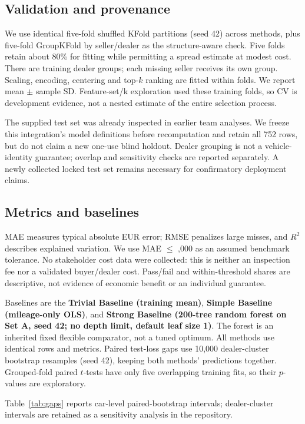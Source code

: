 \subsection{Validation and provenance}
We use identical five-fold shuffled KFold partitions (seed 42) across methods, plus five-fold GroupKFold by seller/dealer as the structure-aware check. Five folds retain about 80\% for fitting while permitting a spread estimate at modest cost. There are \TrainGroups{} training dealer groups; each missing seller receives its own group. Scaling, encoding, centering and top-$k$ ranking are fitted within folds. We report mean $\pm$ sample SD. Feature-set/k exploration used these training folds, so CV is development evidence, not a nested estimate of the entire selection process.

The supplied test set was already inspected in earlier team analyses. We freeze this integration's model definitions before recomputation and retain all 752 rows, but do not claim a new one-use blind holdout. Dealer grouping is not a vehicle-identity guarantee; overlap and sensitivity checks are reported separately. A newly collected locked test set remains necessary for confirmatory deployment claims.

\subsection{Metrics and baselines}
MAE measures typical absolute EUR error; RMSE penalizes large misses, and $R^2$ describes explained variation. We use MAE $\leq$ ,000 as an assumed benchmark tolerance. No stakeholder cost data were collected: this is neither an inspection fee nor a validated buyer/dealer cost. Pass/fail and within-threshold shares are descriptive, not evidence of economic benefit or an individual guarantee.

Baselines are the \textbf{Trivial Baseline (training mean)}, \textbf{Simple Baseline (mileage-only OLS)}, and \textbf{Strong Baseline (200-tree random forest on Set A, seed 42; no depth limit, default leaf size 1)}. The forest is an inherited fixed flexible comparator, not a tuned optimum. All methods use identical rows and metrics. Paired test-loss gaps use 10,000 dealer-cluster bootstrap resamples (seed 42), keeping both methods' predictions together. Grouped-fold paired $t$-tests have only five overlapping training fits, so their $p$-values are exploratory.

Table~\ref{tab:gaps} reports car-level paired-bootstrap intervals; dealer-cluster intervals are retained as a sensitivity analysis in the repository.

